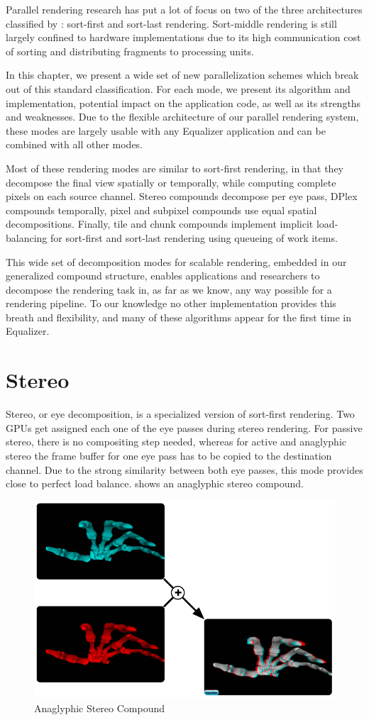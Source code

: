Parallel rendering research has put a lot of focus on two of the three
architectures classified by \cite{Molnar92}: sort-first and sort-last rendering.
Sort-middle rendering is still largely confined to hardware implementations due
to its high communication cost of sorting and distributing fragments to
processing units.

In this chapter, we present a wide set of new parallelization schemes which
break out of this standard classification. For each mode, we present its
algorithm and implementation, potential impact on the application code, as well
as its strengths and weaknesses. Due to the flexible architecture of our
parallel rendering system, these modes are largely usable with any Equalizer
application and can be combined with all other modes.

Most of these rendering modes are similar to sort-first rendering, in that they
decompose the final view spatially or temporally, while computing complete
pixels on each source channel. Stereo compounds decompose per eye pass, DPlex
compounds temporally, pixel and subpixel compounds use equal spatial
decompositions. Finally, tile and chunk compounds implement implicit
load-balancing for sort-first and sort-last rendering using queueing of work
items.

This wide set of decomposition modes for scalable rendering, embedded in our
generalized compound structure, enables applications and researchers to
decompose the rendering task in, as far as we know, any way possible for a
rendering pipeline. To our knowledge no other implementation provides this
breath and flexibility, and many of these algorithms appear for the first time
in Equalizer.

\section{Stereo}

Stereo, or eye decomposition, is a specialized version of sort-first rendering.
Two GPUs get assigned each one of the eye passes during stereo rendering. For
passive stereo, there is no compositing step needed, whereas for active and
anaglyphic stereo the frame buffer for one eye pass has to be copied to the
destination channel. Due to the strong similarity between both eye passes, this
mode provides close to perfect load balance.  shows an anaglyphic
stereo compound.

\begin{figure}
 \includegraphics[width=.618\textwidth]{images/Stereo}
 {\caption{\label{fStereo}Anaglyphic Stereo Compound}}
\end{figure}

